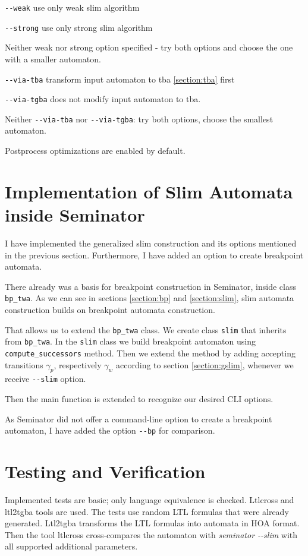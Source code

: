 \documentclass[
	digital,
nolof, nolot
]{fithesis3}
\begin{document}
		\texttt{-{}-weak} use only weak slim algorithm
		
		\texttt{-{}-strong} use only strong slim algorithm
		
		Neither weak nor strong option specified - try both options  and choose the one with a smaller automaton.
		
		\texttt{-{}-via-tba} transform input automaton to tba \ref{section:tba} first
		
		\texttt{-{}-via-tgba} does not modify input automaton to tba.
		
		Neither \texttt{-{}-via-tba} nor \texttt{-{}-via-tgba}: try both options, choose the smallest automaton.
		
		Postprocess optimizations are enabled by default.
		
		
	\section{Implementation of Slim Automata inside Seminator}
	I have implemented the generalized slim construction and its options mentioned in the previous section. Furthermore, I have added an option to create breakpoint automata.
	
	There already was a basis for breakpoint construction in Seminator, inside class \texttt{bp\_twa}.
	As we can see in sections \ref{section:bp} and \ref{section:slim}, slim automata construction builds on breakpoint automata construction.
	
	That allows us to extend the \texttt{bp\_twa} class.
	We create class \texttt{slim} that inherits from \texttt{bp\_twa}.
	In the \texttt{slim} class we build breakpoint automaton using \texttt{compute\_successors} method.
	Then we extend the method by adding accepting transitions $\gamma_p$, respectively $\gamma_w$ according to section \ref{section:gslim}, whenever we receive \texttt{-{}-slim} option.
	
	Then the main function is extended to recognize our desired CLI options.
	
	As Seminator did not offer a command-line option to create a breakpoint automaton, I have added the option \texttt{-{}-bp} for comparison.
	
	
	
	\section{Testing and Verification}
	Implemented tests are basic; only language equivalence is checked.
	Ltlcross and ltl2tgba tools are used. The tests use random LTL formulas that were already generated. Ltl2tgba transforms the LTL formulas into automata in HOA format.
	Then the tool ltlcross cross-compares the automaton with \emph{seminator -{}-slim} with all supported additional parameters.
	
\end{document}
